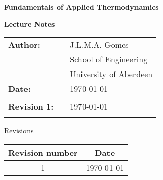 \documentclass[11pts,a4paper,amsmath,amssymb,floatfix]{book}
\theoremstyle{definition}
\begin{document}
\vspace{4cm}

\begin{titlepage}
\begin{center}
\bigskip


\bigskip
\vspace{3.5cm}

   {\bf{\Huge Fundamentals of Applied Thermodynamics }}

\bigskip
   {\bf{\huge Lecture Notes}}

\vspace{3.5cm}

\end{center}

\begin{tabular}{l c l}
{\bf{\large Author:}}                          &     & J.L.M.A. Gomes \\
                                               &     & School of Engineering \\
                                               &     & University of Aberdeen \\
\bigskip
{\bf{\large Date:}}                            &     &   \today\\
                                               &     &         \\
{\bf{\large Revision 1:}}                      &     &   \today\\
                                               &     &         \\
\end{tabular}
\vspace{3.5cm}

\bigskip

\bigskip
\end{titlepage}


\begin{center}
  \Large{ Revisions}

\bigskip

\begin{tabular}{ c c}
\hline
{\bf Revision number}  & {\bf Date } \\
\hline
  1                    & \today \\
\hline 
\end{tabular}
\end{center}
\end{document}
